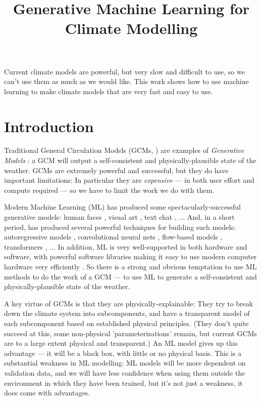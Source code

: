 \documentclass{ametsocV6.1}
\title{Generative Machine Learning for Climate Modelling}
\affiliation{\aff{a}{Met Office Hadley Centre, Exeter, UK}}
\begin{document}
\maketitle


\statement
    Current climate models are powerful, but very slow and difficult to use, so we can't use them as much as we would like. This work shows how to use machine learning to make climate models that are very fast and easy to use.

\section{Introduction}
\label{Intro}

Traditional General Circulation Models (GCMs, \citet{phillips1956general}) are examples of {\em Generative Models} \citep{Generative}: a GCM will output a self-consistent and physically-plausible state of the weather. GCMs are extremely powerful and successful, but they do have important limitations: In particular they are {\em expensive} --- in both user effort and compute required --- so we have to limit the work we do with them.

Modern Machine Learning (ML) has produced some spectacularly-successful generative models: human faces \citep{StyleGAN2}, visual art \citep{Stable_Diffusion}, text chat \citep{ChatGPT}, ... And, in a short period, has produced several powerful techniques for building such models: autoregressive models \citep{oord2016pixel}, convolutional neural nets \citep{LeNet}, flow-based models \citep{dinh2017density}, transformers \citep{vaswani2017attention}, ... In addition, ML is very well-supported in both hardware and software, with powerful software libraries making it easy to use modern computer hardware very efficiently \citep{tensorflow2015-whitepaper}. So there is a strong and obvious temptation to use ML methods to do the work of a GCM --- to use ML to generate a self-consistent and physically-plausible state of the weather.

A key virtue of GCMs is that they are physically-explainable: They try to break down the climate system into subcomponents, and have a transparent model of each subcomponent based on established physical principles. (They don't quite succeed at this, some non-physical 'parameterizations' remain, but current GCMs are to a large extent physical and transparent.) An ML model gives up this advantage --- it will be a black box, with little or no physical basis. This is a substantial weakness in ML modelling: ML models will be more dependent on validation data, and we will have less confidence when using them outside the environment in which they have been trained, but it's not just a weakness, it does come with advantages.
\end{document}
